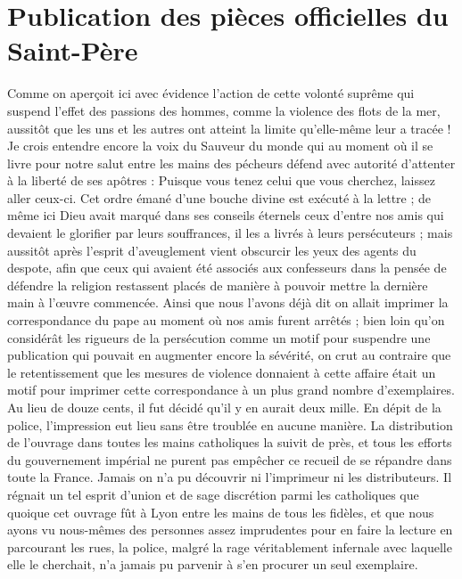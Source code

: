\section*{Publication des pièces officielles du Saint-Père}
Comme on aperçoit ici avec évidence l'action de cette volonté suprême qui suspend l'effet des passions des hommes, comme
la violence des flots de la mer, aussitôt que les uns et les autres ont atteint la limite qu'elle-même leur a tracée ! Je crois entendre encore la voix du Sauveur du monde qui au moment où il se livre pour notre salut entre les mains des pécheurs défend avec autorité d'attenter à la liberté de ses apôtres : Puisque vous tenez celui que vous cherchez, laissez aller ceux-ci. Cet ordre émané d'une bouche divine est exécuté à la lettre ; de même ici Dieu avait marqué dans ses conseils éternels ceux d'entre nos amis qui devaient le glorifier par leurs souffrances, il les a livrés à leurs persécuteurs ; mais aussitôt après l'esprit d'aveuglement vient obscurcir les yeux des agents du despote, afin que ceux qui avaient été associés aux confesseurs dans la pensée de défendre la religion restassent placés de manière à pouvoir mettre la dernière main à l'œuvre commencée. Ainsi que nous l'avons déjà dit on allait imprimer la correspondance du pape au moment où nos amis furent arrêtés ; bien loin qu'on considérât les rigueurs de la persécution comme un motif pour suspendre une publication qui pouvait en augmenter encore la sévérité, on crut au contraire que le retentissement que les mesures de violence donnaient à cette affaire était un motif pour imprimer cette correspondance à un plus grand nombre d'exemplaires. Au lieu de douze cents, il fut décidé qu'il y en aurait deux mille. En dépit de la police, l'impression eut lieu sans être troublée en aucune manière. La distribution de l'ouvrage dans toutes les mains catholiques la suivit de près, et tous les efforts du gouvernement impérial ne purent pas empêcher ce recueil de se répandre dans toute la France. Jamais on n'a pu découvrir ni l'imprimeur ni les distributeurs. Il régnait
un tel esprit d'union et de sage discrétion parmi les catholiques que quoique cet ouvrage fût à Lyon entre les mains de tous les fidèles, et que nous ayons vu nous-mêmes des personnes assez imprudentes pour en faire la lecture en parcourant les rues, la police, malgré la rage véritablement infernale avec laquelle elle le cherchait, n'a jamais pu parvenir à s'en procurer un seul exemplaire.

